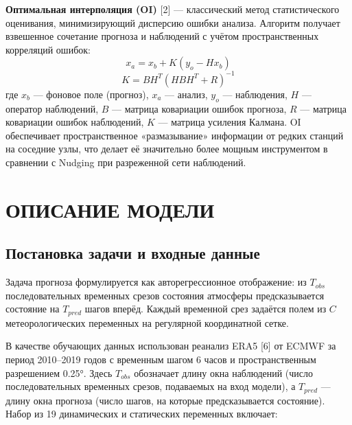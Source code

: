 \documentclass[14pt,a4paper]{extarticle}
\numberwithin{table}{section}
\numberwithin{figure}{section}
\numberwithin{equation}{section}
\begin{document}
\textbf{Оптимальная интерполяция (OI)} {[}2{]} --- классический метод
статистического оценивания, минимизирующий дисперсию ошибки анализа.
Алгоритм получает взвешенное сочетание прогноза и наблюдений с учётом
пространственных корреляций ошибок: \[x_a = x_b + K(y_o - Hx_b)\]
\[K = BH^T(HBH^T + R)^{-1}\] где \(x_b\) --- фоновое поле (прогноз),
\(x_a\) --- анализ, \(y_o\) --- наблюдения, \(H\) --- оператор
наблюдений, \(B\) --- матрица ковариации ошибок прогноза, \(R\) ---
матрица ковариации ошибок наблюдений, \(K\) --- матрица усиления
Калмана. OI обеспечивает пространственное «размазывание» информации от
редких станций на соседние узлы, что делает её значительно более мощным
инструментом в сравнении с Nudging при разреженной сети наблюдений.


\newpage

\section{ОПИСАНИЕ МОДЕЛИ}\label{ux43eux43fux438ux441ux430ux43dux438ux435-ux43cux43eux434ux435ux43bux438}

\subsection{Постановка задачи и входные данные}\label{ux43fux43eux441ux442ux430ux43dux43eux432ux43aux430-ux437ux430ux434ux430ux447ux438-ux438-ux432ux445ux43eux434ux43dux44bux435-ux434ux430ux43dux43dux44bux435}

Задача прогноза формулируется как авторегрессионное отображение: из
\(T_{obs}\) последовательных временных срезов состояния атмосферы
предсказывается состояние на \(T_{pred}\) шагов вперёд. Каждый временной
срез задаётся полем из \(C\) метеорологических переменных на регулярной
координатной сетке.

В качестве обучающих данных использован реанализ ERA5 {[}6{]} от ECMWF
за период 2010--2019 годов с временным шагом 6 часов и пространственным
разрешением 0.25°. Здесь \(T_{obs}\) обозначает длину окна наблюдений
(число последовательных временных срезов, подаваемых на вход модели), а
\(T_{pred}\) --- длину окна прогноза (число шагов, на которые
предсказывается состояние). Набор из 19 динамических и статических
переменных включает:
\end{document}
